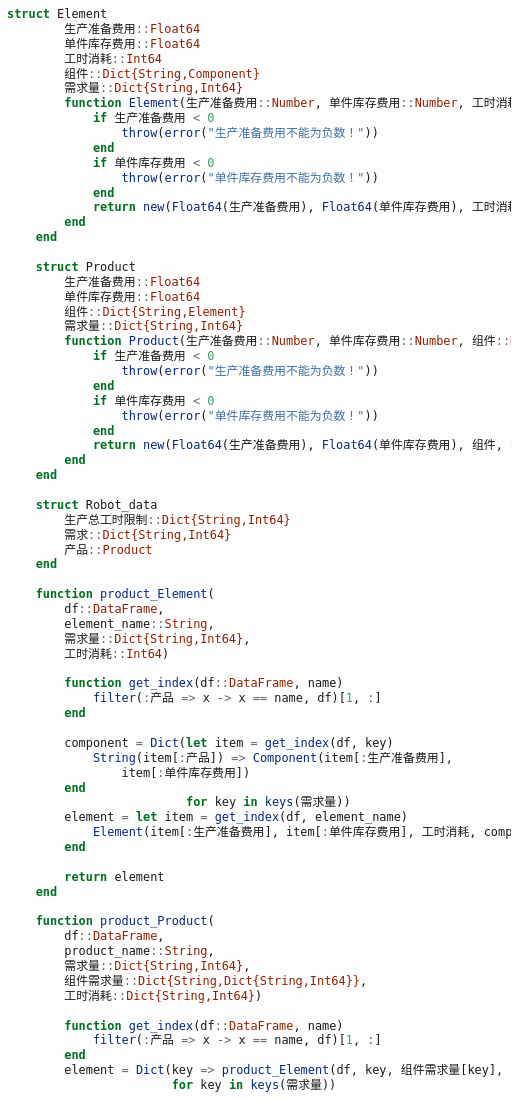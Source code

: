 \begin{appendices}
\begin{lstlisting}[language=julia]
    struct Element
        生产准备费用::Float64
        单件库存费用::Float64
        工时消耗::Int64
        组件::Dict{String,Component}
        需求量::Dict{String,Int64}
        function Element(生产准备费用::Number, 单件库存费用::Number, 工时消耗::Int64, 组件::Dict{String,Component}, 需求量::Dict{String,Int64})
            if 生产准备费用 < 0
                throw(error("生产准备费用不能为负数！"))
            end
            if 单件库存费用 < 0
                throw(error("单件库存费用不能为负数！"))
            end
            return new(Float64(生产准备费用), Float64(单件库存费用), 工时消耗, 组件, 需求量)
        end
    end
    
    struct Product
        生产准备费用::Float64
        单件库存费用::Float64
        组件::Dict{String,Element}
        需求量::Dict{String,Int64}
        function Product(生产准备费用::Number, 单件库存费用::Number, 组件::Dict{String,Element}, 需求量::Dict{String,Int64})
            if 生产准备费用 < 0
                throw(error("生产准备费用不能为负数！"))
            end
            if 单件库存费用 < 0
                throw(error("单件库存费用不能为负数！"))
            end
            return new(Float64(生产准备费用), Float64(单件库存费用), 组件, 需求量)
        end
    end
    
    struct Robot_data
        生产总工时限制::Dict{String,Int64}
        需求::Dict{String,Int64}
        产品::Product
    end
    
    function product_Element(
        df::DataFrame,
        element_name::String,
        需求量::Dict{String,Int64},
        工时消耗::Int64)
    
        function get_index(df::DataFrame, name)
            filter(:产品 => x -> x == name, df)[1, :]
        end
    
        component = Dict(let item = get_index(df, key)
            String(item[:产品]) => Component(item[:生产准备费用],
                item[:单件库存费用])
        end
                         for key in keys(需求量))
        element = let item = get_index(df, element_name)
            Element(item[:生产准备费用], item[:单件库存费用], 工时消耗, component, 需求量)
        end
    
        return element
    end
    
    function product_Product(
        df::DataFrame,
        product_name::String,
        需求量::Dict{String,Int64},
        组件需求量::Dict{String,Dict{String,Int64}},
        工时消耗::Dict{String,Int64})
    
        function get_index(df::DataFrame, name)
            filter(:产品 => x -> x == name, df)[1, :]
        end
        element = Dict(key => product_Element(df, key, 组件需求量[key], 工时消耗[key])
                       for key in keys(需求量))
    

\end{lstlisting}
\end{appendices}
